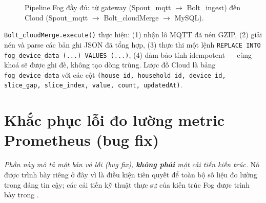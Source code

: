 \documentclass[13pt,a4paper]{report}
\newcommand{\code}[1]{\texttt{\small #1}}
\begin{document}
\begin{figure}[H]
\centering
{}
\caption{Pipeline Fog đầy đủ: từ gateway (Spout\_mqtt $\to$ Bolt\_ingest) đến Cloud (Spout\_mqtt $\to$ Bolt\_cloudMerge $\to$ MySQL).}
\label{fig:fog-topo}
\end{figure}

\code{Bolt\_cloudMerge.execute()} thực hiện: (1) nhận lô MQTT đã nén GZIP,
(2) giải nén và parse các bản ghi JSON đã tổng hợp, (3) thực thi một lệnh
\code{REPLACE INTO fog\_device\_data (...) VALUES (...)}, (4) đảm bảo tính
idempotent --- cùng khoá sẽ được ghi đè, không tạo dòng trùng. Lược đồ Cloud là
bảng \code{fog\_device\_data} với các cột \code{(house\_id, household\_id,
device\_id, slice\_gap, slice\_index, value, count, updatedAt)}.

\section{Khắc phục lỗi đo lường metric Prometheus (bug fix)}
\label{sec:prometheus-fix}

\textit{Phần này mô tả một bản vá lỗi (bug fix), \textbf{không phải} một cải tiến
kiến trúc.} Nó được trình bày riêng ở đây vì là điều kiện tiên quyết để toàn bộ số
liệu đo lường trong  đáng tin cậy; các cải tiến kỹ thuật thực
sự của kiến trúc Fog được trình bày trong .
\end{document}
